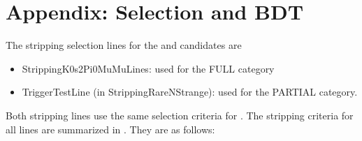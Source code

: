 \clearpage
\newpage
\section{Appendix: Selection and BDT}
\label{app:selection}


The stripping selection lines for the \KzPzMuMu and \Kspipi candidates are
\begin{itemize}
 \item StrippingK0s2Pi0MuMuLines: used for the FULL \KzPzMuMu category
 \item TriggerTestLine (in StrippingRareNStrange): used for the PARTIAL \KzPzMuMu category.
\end{itemize}
Both stripping lines use the same selection criteria for \Kspipi. 
The stripping criteria for all lines are summarized in . They are as follows:
